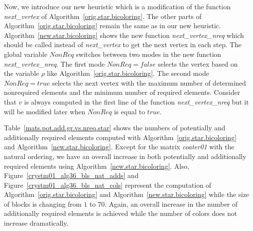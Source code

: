\documentclass[12pt, twoside,a4paper,toc=bibliography]{scrbook}
\newcommand{\figref}[1]{Figure~\protect\ref{#1}}
\newcommand{\coderef}[1]{Algorithm~\protect\ref{#1}}
\begin{document}
Now, we introduce our new heuristic  which is a modification of the function \textit{next\_vertex}
of \coderef{orig.star.bicoloring}. The other parts of \coderef{orig.star.bicoloring} remain the same as
in our new heuristic.
\coderef{new.star.bicoloring} shows the new function \textit{next\_vertex\_nreq} which should be called
instead of \textit{next\_vertex} to get the next vertex in each step.
The global variable $NonReq$ switches between two modes in the new function \textit{next\_vertex\_nreq}.
The first mode $NonReq=false$ selects the vertex
based on the variable $\rho$ like \coderef{orig.star.bicoloring}.
The second mode $NonReq=true$ selects
the next vertex with the maximum number of determined nonrequired elements
and the minimum number of required elements.
Consider that $v$ is always computed in the first line of the function \textit{next\_vertex\_nreq}
but it will be modified later when $NonReq$ is equal to $true$.

Table~\ref{mats.pot.add.gr.vs.nreq.star} shows the numbers of potentially and additionally required elements
computed with \coderef{orig.star.bicoloring} and \coderef{new.star.bicoloring}.
Except for the matrix \textit{coater01} with the natural ordering,
we have an overall increase in both potentially and additionally required elements using \coderef{new.star.bicoloring}.
Also, \figref{crystm01_alg36_bls_nat_adds} and \figref{crystm01_alg36_bls_nat_cols} represent the computation of
\coderef{orig.star.bicoloring} and \coderef{new.star.bicoloring} while the size of blocks is changing from $1$ to $70$.
Again, an overall increase in the number of additionally required elements is achieved while the number of colors
does not increase dramatically.
\end{document}
